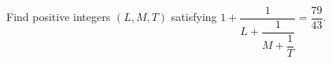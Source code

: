 Find positive integers $(L,M,T)$ satisfying $1+\dfrac{1}{L+\dfrac{1}{M+\dfrac{1}{T}}}=\dfrac{79}{43}$.
